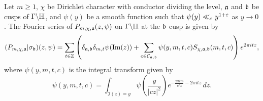 \documentclass[12pt,oneside]{book}
\begin{document}
    \begin{proposition}
      Let $m \ge 1$, $\chi$ be Dirichlet character with conductor dividing the level, $\mathfrak{a}$ and $\mathfrak{b}$ be cusps of $\Gamma\backslash\mathbb{H}$, and $\psi(y)$ be a smooth function such that $\psi(y) \ll_{\varepsilon} y^{1+\varepsilon}$ as $y \to 0$. The Fourier series of $P_{m,\chi,\mathfrak{a}}(z,\psi)$ on $\Gamma\backslash\mathbb{H}$ at the $\mathfrak{b}$ cusp is given by
      \[
        (P_{m,\chi,\mathfrak{a}}|\sigma_{\mathfrak{b}})(z,\psi) = \sum_{t \in \mathbb{Z}}\left(\delta_{\mathfrak{a},\mathfrak{b}}\delta_{m,t}\psi(\mathrm{Im}(z))+\sum_{\substack{c \in \mathcal{C}_{\mathfrak{a},\mathfrak{b}}}}\psi(y,m,t,c)S_{\chi,\mathfrak{a},\mathfrak{b}}(m,t,c)\right)e^{2\pi itz},
      \]
      where $\psi(y,m,t,c)$ is the integral transform given by
      \[
        \psi(y,m,t,c) = \int_{\Im(z) = y}\psi\left(\frac{y}{|cz|^{2}}\right)e^{-\frac{2\pi im}{c^{2}z}-2\pi itz}\,dz.
      \]
    \end{proposition}
\end{document}

